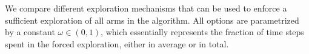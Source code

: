 %

We compare different exploration mechanisms that can be used to enforce a sufficient exploration of all arms in the \GLRklUCB{} algorithm.
All options are parametrized by a constant $\omega\in(0,1)$, which essentially represents the fraction of time steps spent in the forced exploration, either in average or in total.


